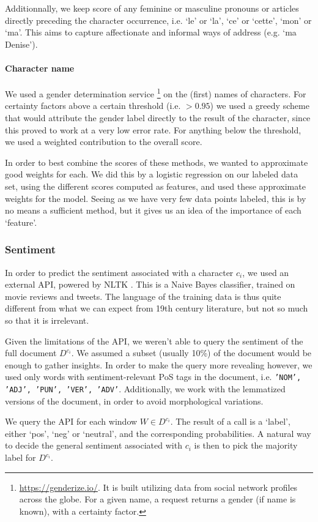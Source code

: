 Additionnally, we keep score of any feminine or masculine pronouns or articles directly preceding the character occurrence, i.e. `le' or `la', `ce' or `cette', `mon' or `ma'. This aims to capture affectionate and informal ways of address (e.g. `ma Denise').

\paragraph{Character name}
We used a gender determination service \footnote{\href{https://genderize.io/}{https://genderize.io/}. It is built utilizing data from social network profiles across the globe. For a given name, a request returns a gender (if name is known), with a certainty factor.} on the (first) names of characters. For certainty factors above a certain threshold (i.e. $> 0.95$) we used a greedy scheme that would attribute the gender label directly to the result of the character, since this proved to work at a very low error rate. For anything below the threshold, we used a weighted contribution to the overall score.
\vspace*{1em}

In order to best combine the scores of these methods, we wanted to approximate good weights for each. We did this by a logistic regression on our labeled data set, using the different scores computed as features, and used these approximate weights for the model. Seeing as we have very few data points labeled, this is by no means a sufficient method, but it gives us an idea of the importance of each `feature'.

\subsubsection{Sentiment} 
In order to predict the sentiment associated with a character $c_i$, we used an external API, powered by NLTK \cite{perkins2010textclass}. This is a Naive Bayes classifier, trained on movie reviews and tweets. The language of the training data is thus quite different from what we can expect from 19th century literature, but not so much so that it is irrelevant.

Given the limitations of the API, we weren't able to query the sentiment of the full document $D^{c_i}$. We assumed a subset (usually 10\%) of the document would be enough to gather insights. In order to make the query more revealing however, we used only words with sentiment-relevant PoS tags in the document, i.e. \texttt{'NOM', 'ADJ', 'PUN', 'VER', 'ADV'}. Additionally, we work with the lemmatized versions of the document, in order to avoid morphological variations.

We query the API for each window $W \in D^{c_i}$. The result of a call is a `label', either `pos', `neg' or `neutral', and the corresponding probabilities. A natural way to decide the general sentiment associated with $c_i$ is then to pick the majority label for $D^{c_i}$.